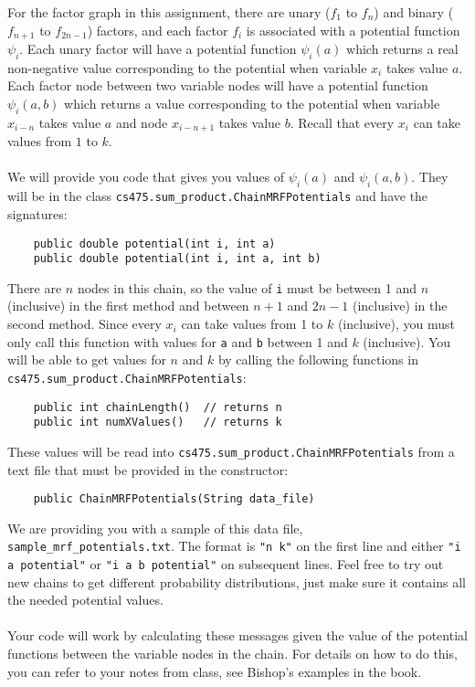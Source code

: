 \documentclass[11pt]{article}
\newcommand{\code}[1]{{\footnotesize \tt #1}}
\begin{document}
For the factor graph in this assignment, there are unary ($f_1$ to $f_n$) and binary ($f_{n+1}$ to $f_{2n-1}$) factors, and each factor $f_i$ is associated with a potential function $\psi_i$.
Each unary factor will have a potential function $\psi_{i}(a)$ which returns a real non-negative value corresponding to the potential when variable $x_{i}$ takes value $a$. Each factor node between two variable nodes will have a potential function $\psi_{i}(a, b)$ which returns a value corresponding to the potential when variable $x_{i-n}$ takes value $a$ and node $x_{i-n+1}$ takes value $b$. Recall that every $x_i$ can take values from $1$ to $k$.\\
\\
We will provide you code that gives you values of $\psi_i(a)$ and $\psi_i(a, b)$. They will be in the class \code{cs475.sum\_product.ChainMRFPotentials} and have the signatures:
\begin{verbatim}
    public double potential(int i, int a)
    public double potential(int i, int a, int b)
\end{verbatim}
There are $n$ nodes in this chain, so the value of \code{i} must be between 1 and $n$ (inclusive) in the first method and between $n+1$ and $2n-1$ (inclusive) in the second method. Since every $x_i$ can take values from 1 to $k$ (inclusive), you must only call this function with values for \code{a} and \code{b} between 1 and $k$ (inclusive). You will be able to get values for $n$ and $k$ by calling the following functions in \code{cs475.sum\_product.ChainMRFPotentials}:
\begin{verbatim}
    public int chainLength()  // returns n
    public int numXValues()   // returns k
\end{verbatim}
These values will be read into \code{cs475.sum\_product.ChainMRFPotentials} from a text file that must be provided in the constructor:
\begin{verbatim}
    public ChainMRFPotentials(String data_file)
\end{verbatim}
We are providing you with a sample of this data file, \code{sample\_mrf\_potentials.txt}. The format is \code{"n k"} on the first line and either \code{"i a potential"} or \code{"i a b potential"} on subsequent lines. Feel free to try out new chains to get different probability distributions, just make sure it contains all the needed potential values.\\
\\
Your code will work by calculating these messages given the value of the potential functions between the variable nodes in the chain. For details on how to do this, you can refer to your notes from class, see Bishop's examples in the book.
\end{document}
